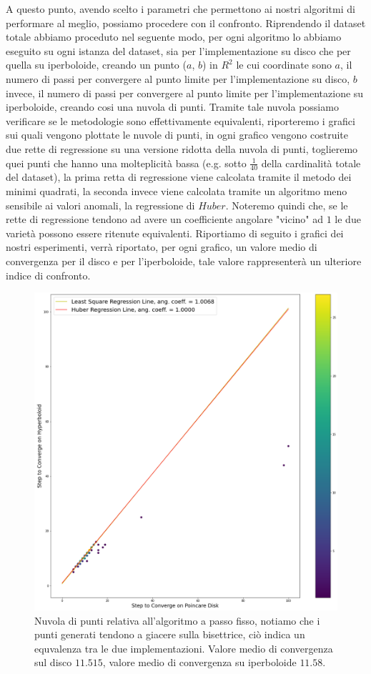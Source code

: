 \documentclass[a4paper, 12pt]{article}
\begin{document}
A questo punto, avendo scelto i parametri che permettono ai nostri algoritmi di performare al meglio, possiamo procedere con il confronto. Riprendendo il dataset totale abbiamo proceduto nel seguente modo, per ogni algoritmo lo abbiamo eseguito su ogni istanza del dataset, sia per l'implementazione su disco che per quella su iperboloide, creando un punto  ($a$, $b$) in $R^2$ le cui coordinate sono $a$, il numero di passi per convergere al punto limite per l'implementazione su disco, $b$ invece, il numero di passi per convergere al punto limite per l'implementazione su iperboloide, creando cosi una nuvola di punti. Tramite tale nuvola possiamo verificare se le metodologie sono effettivamente equivalenti, riporteremo i grafici sui quali vengono plottate le nuvole di punti, in ogni grafico vengono costruite due rette di regressione su una versione ridotta della nuvola di punti, toglieremo quei punti che hanno una molteplicità bassa (e.g. sotto $\frac{1}{40}$ della cardinalità totale del dataset), la prima retta di regressione viene calcolata tramite il metodo dei minimi quadrati, la seconda invece viene calcolata tramite un algoritmo meno sensibile ai valori anomali, la regressione di $Huber$. Noteremo quindi che, se le rette di regressione tendono ad avere un coefficiente angolare "vicino" ad $1$ le due varietà possono essere ritenute equivalenti.  Riportiamo di seguito i grafici dei nostri esperimenti, verrà riportato, per ogni grafico, un valore medio di convergenza per il disco e per l'iperboloide, tale valore rappresenterà un ulteriore indice di confronto.\\
\begin{figure}[H] %
    \centering\includegraphics[width=1\textwidth]{fixed_step_size.png}
    \caption{Nuvola di punti relativa all'algoritmo a passo fisso, notiamo che i punti generati tendono a giacere sulla bisettrice, ciò indica un equvalenza tra le due implementazioni. Valore medio di convergenza sul disco $11.515$, valore medio di convergenza su iperboloide $11.58$.}
\end{figure}
\end{document}
